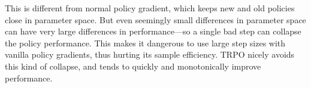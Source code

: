 This is different from normal policy gradient, which keeps new and old policies close in parameter space. But even seemingly small differences in parameter space can have very large differences in performance—so a single bad step can collapse the policy performance. This makes it dangerous to use large step sizes with vanilla policy gradients, thus hurting its sample efficiency. TRPO nicely avoids this kind of collapse, and tends to quickly and monotonically improve performance.

